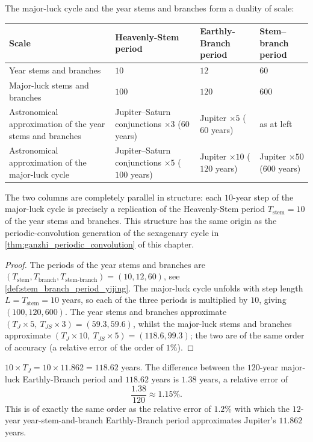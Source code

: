 \begin{theorem}\label{thm:dayun_vs_year_ganzhi_yijing}
The major-luck cycle and the year stems and branches form a duality of scale:
\begin{center}
\begin{tabularx}{\linewidth}{@{}>{\raggedright\arraybackslash}X >{\raggedright\arraybackslash}X >{\raggedright\arraybackslash}X >{\raggedright\arraybackslash}X@{}}
\toprule
Scale & Heavenly-Stem period & Earthly-Branch period & Stem--branch period \\
\midrule
Year stems and branches & $10$ & $12$ & $60$ \\
Major-luck stems and branches & $100$ & $120$ & $600$ \\
\midrule
Astronomical approximation of the year stems and branches & Jupiter--Saturn conjunctions $\times 3$ ($60$ years) & Jupiter $\times 5$ ($60$ years) & as at left \\
Astronomical approximation of the major-luck cycle & Jupiter--Saturn conjunctions $\times 5$ ($100$ years) & Jupiter $\times 10$ ($120$ years) & Jupiter $\times 50$ ($600$ years) \\
\bottomrule
\end{tabularx}
\end{center}
The two columns are completely parallel in structure: each $10$-year step of the major-luck cycle is precisely a replication of the Heavenly-Stem period $T_{\text{stem}}=10$ of the year stems and branches. This structure has the same origin as the periodic-convolution generation of the sexagenary cycle in \cref{thm:ganzhi_periodic_convolution} of this chapter.
\end{theorem}

\begin{proof}
The periods of the year stems and branches are $(T_{\text{stem}},T_{\text{branch}},T_{\text{stem-branch}})=(10,12,60)$, see \cref{def:stem_branch_period_yijing}. The major-luck cycle unfolds with step length $L=T_{\text{stem}}=10$ years, so each of the three periods is multiplied by $10$, giving $(100,120,600)$. The year stems and branches approximate $(T_J\times 5,\ T_{JS}\times 3)=(59.3,59.6)$, whilst the major-luck stems and branches approximate $(T_J\times 10,\ T_{JS}\times 5)=(118.6,99.3)$; the two are of the same order of accuracy (a relative error of the order of $1\%$).
\end{proof}

\begin{example}\label{ex:dayun_jupiter_120_yijing}
$10\times T_J = 10\times 11.862 = 118.62$ years. The difference between the $120$-year major-luck Earthly-Branch period and $118.62$ years is $1.38$ years, a relative error of
\[
\frac{1.38}{120}\approx 1.15\%.
\]
This is of exactly the same order as the relative error of $1.2\%$ with which the $12$-year year-stem-and-branch Earthly-Branch period approximates Jupiter's $11.862$ years.
\end{example}

